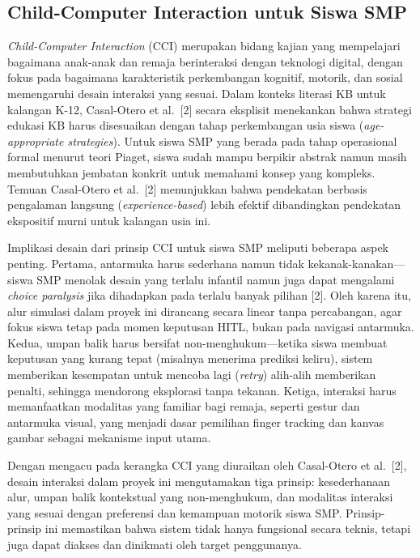 \subsection{Child-Computer Interaction untuk Siswa SMP}
\label{subsec:cci-smp}

\textit{Child-Computer Interaction} (CCI) merupakan bidang kajian yang mempelajari bagaimana anak-anak dan remaja berinteraksi dengan teknologi digital, dengan fokus pada bagaimana karakteristik perkembangan kognitif, motorik, dan sosial memengaruhi desain interaksi yang sesuai. Dalam konteks literasi KB untuk kalangan K-12, Casal-Otero et al.\ [2] secara eksplisit menekankan bahwa strategi edukasi KB harus disesuaikan dengan tahap perkembangan usia siswa (\textit{age-appropriate strategies}). Untuk siswa SMP yang berada pada tahap operasional formal menurut teori Piaget, siswa sudah mampu berpikir abstrak namun masih membutuhkan jembatan konkrit untuk memahami konsep yang kompleks. Temuan Casal-Otero et al.\ [2] menunjukkan bahwa pendekatan berbasis pengalaman langsung (\textit{experience-based}) lebih efektif dibandingkan pendekatan ekspositif murni untuk kalangan usia ini.

Implikasi desain dari prinsip CCI untuk siswa SMP meliputi beberapa aspek penting. Pertama, antarmuka harus sederhana namun tidak kekanak-kanakan---siswa SMP menolak desain yang terlalu infantil namun juga dapat mengalami \textit{choice paralysis} jika dihadapkan pada terlalu banyak pilihan [2]. Oleh karena itu, alur simulasi dalam proyek ini dirancang secara linear tanpa percabangan, agar fokus siswa tetap pada momen keputusan HITL, bukan pada navigasi antarmuka. Kedua, umpan balik harus bersifat non-menghukum---ketika siswa membuat keputusan yang kurang tepat (misalnya menerima prediksi keliru), sistem memberikan kesempatan untuk mencoba lagi (\textit{retry}) alih-alih memberikan penalti, sehingga mendorong eksplorasi tanpa tekanan. Ketiga, interaksi harus memanfaatkan modalitas yang familiar bagi remaja, seperti gestur dan antarmuka visual, yang menjadi dasar pemilihan finger tracking dan kanvas gambar sebagai mekanisme input utama.

Dengan mengacu pada kerangka CCI yang diuraikan oleh Casal-Otero et al.\ [2], desain interaksi dalam proyek ini mengutamakan tiga prinsip: kesederhanaan alur, umpan balik kontekstual yang non-menghukum, dan modalitas interaksi yang sesuai dengan preferensi dan kemampuan motorik siswa SMP. Prinsip-prinsip ini memastikan bahwa sistem tidak hanya fungsional secara teknis, tetapi juga dapat diakses dan dinikmati oleh target penggunanya.

